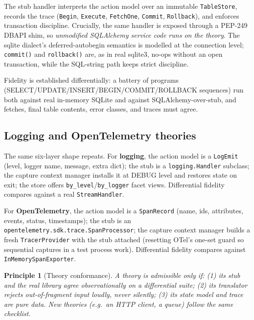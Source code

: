 \documentclass[11pt,a4paper]{article}
\newtheorem{principle}{Principle}
\begin{document}
The stub handler interprets the action model over an immutable
\texttt{TableStore}, records the trace (\texttt{Begin}, \texttt{Execute},
\texttt{FetchOne}, \texttt{Commit}, \texttt{Rollback}), and enforces
transaction discipline.  Crucially, the same handler is exposed
through a PEP-249 DBAPI shim, so \emph{unmodified SQLAlchemy service
code runs on the theory}.  The sqlite dialect's deferred-autobegin
semantics is modelled at the connection level; \texttt{commit()} and
\texttt{rollback()} are, as in real sqlite3, no-ops without an open
transaction, while the SQL-string path keeps strict discipline.

Fidelity is established differentially: a battery of programs
(SELECT/UPDATE/INSERT/BEGIN/COMMIT/ROLLBACK sequences) run both
against real in-memory SQLite and against SQLAlchemy-over-stub, and
fetches, final table contents, error classes, and traces must agree.

\subsection{Logging and OpenTelemetry theories}

The same six-layer shape repeats.  For \textbf{logging}, the action
model is a \texttt{LogEmit} (level, logger name, message, extra dict);
the stub is a \texttt{logging.Handler} subclass; the capture context
manager installs it at DEBUG level and restores state on exit; the
store offers \texttt{by\_level}/\texttt{by\_logger} facet views.
Differential fidelity compares against a real \texttt{StreamHandler}.

For \textbf{OpenTelemetry}, the action model is a \texttt{SpanRecord}
(name, ids, attributes, events, status, timestamps); the stub is an
\texttt{opentelemetry.sdk.trace.SpanProcessor}; the capture context
manager builds a fresh \texttt{TracerProvider} with the stub attached
(resetting OTel's one-set guard so sequential captures in a test
process work).  Differential fidelity compares against
\texttt{InMemorySpanExporter}.

\begin{principle}[Theory conformance]
A theory is admissible only if: (1) its stub and the real library
agree observationally on a differential suite; (2) its translator
rejects out-of-fragment input loudly, never silently; (3) its state
model and trace are pure data.  New theories (e.g.\ an HTTP client, a
queue) follow the same checklist.
\end{principle}

\end{document}
